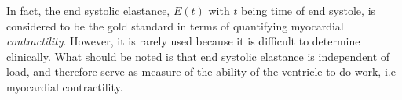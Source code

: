 In fact, the end systolic elastance, $E(t)$ with $t$ being time of end
systole, is considered to be the gold
standard in terms of quantifying myocardial \emph{contractility}.
However, it is rarely used because it is difficult to determine
clinically. What should be noted is that end systolic elastance is
independent of load, and therefore serve as measure of the ability of
the ventricle to do work, i.e myocardial contractility.







% 
















